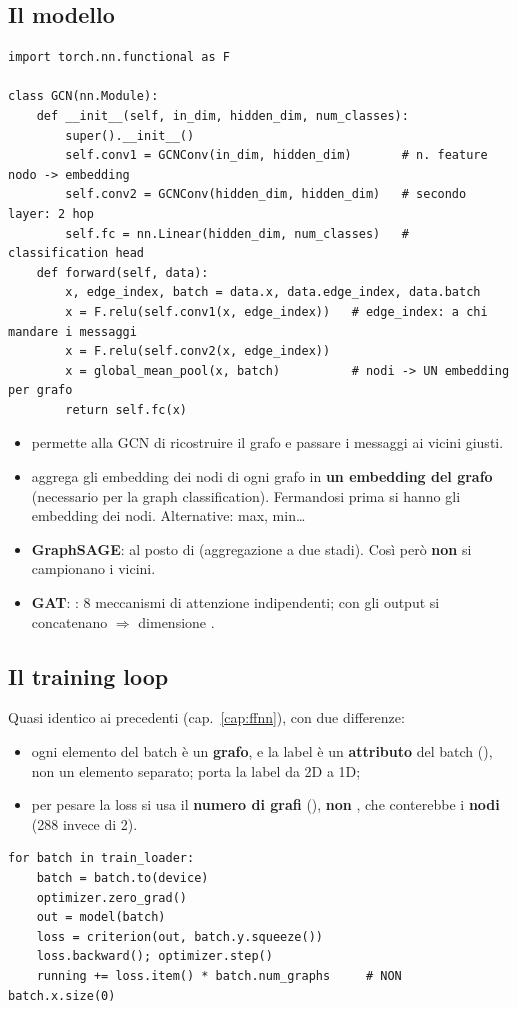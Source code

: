 \subsection{Il modello}
\begin{lstlisting}
import torch.nn.functional as F

class GCN(nn.Module):
    def __init__(self, in_dim, hidden_dim, num_classes):
        super().__init__()
        self.conv1 = GCNConv(in_dim, hidden_dim)       # n. feature nodo -> embedding
        self.conv2 = GCNConv(hidden_dim, hidden_dim)   # secondo layer: 2 hop
        self.fc = nn.Linear(hidden_dim, num_classes)   # classification head
    def forward(self, data):
        x, edge_index, batch = data.x, data.edge_index, data.batch
        x = F.relu(self.conv1(x, edge_index))   # edge_index: a chi mandare i messaggi
        x = F.relu(self.conv2(x, edge_index))
        x = global_mean_pool(x, batch)          # nodi -> UN embedding per grafo
        return self.fc(x)
\end{lstlisting}
\begin{itemize}
  \item {} permette alla GCN di ricostruire il grafo e passare i messaggi ai vicini giusti.
  \item {} aggrega gli embedding dei nodi di ogni grafo in \textbf{un embedding del grafo} (necessario per la
        graph classification). Fermandosi prima si hanno gli embedding dei nodi. Alternative: max, min\ldots
  \item \textbf{GraphSAGE}:  al posto di  (aggregazione a due stadi). Così però \textbf{non} si campionano i vicini.
  \item \textbf{GAT}: : 8 meccanismi di attenzione indipendenti; con
         gli output si concatenano $\Rightarrow$ dimensione .
\end{itemize}

\subsection{Il training loop}
Quasi identico ai precedenti (cap.~\ref{cap:ffnn}), con due differenze:
\begin{itemize}
  \item ogni elemento del batch è un \textbf{grafo}, e la label è un \textbf{attributo} del batch (), non un elemento separato;
         porta la label da 2D a 1D;
  \item per pesare la loss si usa il \textbf{numero di grafi} (), \textbf{non} , che conterebbe i
        \textbf{nodi} (288 invece di 2).
\end{itemize}
\begin{lstlisting}
for batch in train_loader:
    batch = batch.to(device)
    optimizer.zero_grad()
    out = model(batch)
    loss = criterion(out, batch.y.squeeze())
    loss.backward(); optimizer.step()
    running += loss.item() * batch.num_graphs     # NON batch.x.size(0)
\end{lstlisting}

